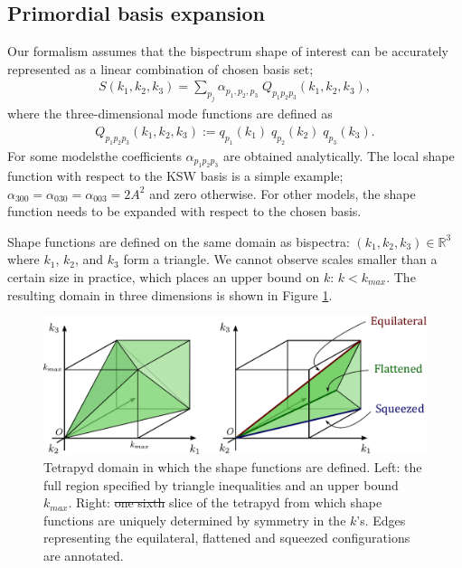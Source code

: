 \documentclass[a4paper,12pt,times,custombib,print,index]{Classes/PhDThesisPSnPDF} %
\providecommand{\DIFadd}[1]{{\protect\color{blue}\uwave{#1}}} %
\providecommand{\DIFdel}[1]{{\protect\color{red}\sout{#1}}}                      %
\providecommand{\DIFaddbegin}{} %
\providecommand{\DIFaddend}{} %
\providecommand{\DIFdelbegin}{} %
\providecommand{\DIFdelend}{} %
\providecommand{\DIFaddFL}[1]{\DIFadd{#1}} %
\providecommand{\DIFdelFL}[1]{\DIFdel{#1}} %
\providecommand{\DIFaddbeginFL}{} %
\providecommand{\DIFaddendFL}{} %
\providecommand{\DIFdelbeginFL}{} %
\providecommand{\DIFdelendFL}{} %
\newcommand{\DIFscaledelfig}{0.5}
\newlength{\DIFdelgraphicswidth} %
\newlength{\DIFdelgraphicsheight} %
\newcommand{\DIFaddincludegraphics}[2][]{{\color{blue}\fbox{\DIFOincludegraphics[#1]{#2}}}} %
\newcommand{\DIFdelincludegraphics}[2][]{%
\sbox{\DIFdelgraphicsbox}{\DIFOincludegraphics[#1]{#2}}%
\settoboxwidth{\DIFdelgraphicswidth}{\DIFdelgraphicsbox} %
\settoboxtotalheight{\DIFdelgraphicsheight}{\DIFdelgraphicsbox} %
\scalebox{\DIFscaledelfig}{%
\parbox[b]{\DIFdelgraphicswidth}{\usebox{\DIFdelgraphicsbox}\\[-\baselineskip] \rule{\DIFdelgraphicswidth}{0em}}\llap{\resizebox{\DIFdelgraphicswidth}{\DIFdelgraphicsheight}{%
\setlength{\unitlength}{\DIFdelgraphicswidth}%
\begin{picture}(1,1)%
\thicklines\linethickness{2pt} %
{\color[rgb]{1,0,0}\put(0,0){\framebox(1,1){}}}%
{\color[rgb]{1,0,0}\put(0,0){\line( 1,1){1}}}%
{\color[rgb]{1,0,0}\put(0,1){\line(1,-1){1}}}%
\end{picture}%
}\hspace*{3pt}}} %
} %
\DeclareRobustCommand{\DIFaddbegin}{\DIFOaddbegin \let\includegraphics\DIFaddincludegraphics} %
\DeclareRobustCommand{\DIFaddend}{\DIFOaddend \let\includegraphics\DIFOincludegraphics} %
\DeclareRobustCommand{\DIFdelbegin}{\DIFOdelbegin \let\includegraphics\DIFdelincludegraphics} %
\DeclareRobustCommand{\DIFdelend}{\DIFOaddend \let\includegraphics\DIFOincludegraphics} %
\DeclareRobustCommand{\DIFaddbeginFL}{\DIFOaddbeginFL \let\includegraphics\DIFaddincludegraphics} %
\DeclareRobustCommand{\DIFaddendFL}{\DIFOaddendFL \let\includegraphics\DIFOincludegraphics} %
\DeclareRobustCommand{\DIFdelbeginFL}{\DIFOdelbeginFL \let\includegraphics\DIFdelincludegraphics} %
\DeclareRobustCommand{\DIFdelendFL}{\DIFOaddendFL \let\includegraphics\DIFOincludegraphics} %
\begin{document}
\subsection{Primordial basis expansion} \label{section:primordial_basis_expansion}

Our formalism assumes that the bispectrum shape of interest can be accurately represented as a linear combination of \DIFaddbegin \DIFadd{a }\DIFaddend chosen basis set; 
\begin{align}
	S(k_1,k_2,k_3) = \sum_{p_j} \alpha_{p_1,p_2,p_3} \; Q_{p_1 p_2 p_3}(k_1, k_2, k_3),
\end{align}
where the three-dimensional mode functions are defined as
\begin{align}
	Q_{p_1 p_2 p_3} (k_1, k_2, k_3) := q_{p_1}(k_1) \; q_{p_2}(k_2) \; q_{p_3}(k_3).
\end{align}
For some models\DIFaddbegin \DIFadd{, }\DIFaddend the coefficients $\alpha_{p_1 p_2 p_3}$ are obtained analytically. The local shape function with respect to the KSW basis is a simple example; $\alpha_{300}=\alpha_{030}=\alpha_{003}=2A^2$ and zero otherwise. For other models, the shape function needs to be expanded with respect to the chosen basis. 

Shape functions are defined on the same domain as bispectra: $(k_1,k_2,k_3) \in \mathbb{R}^3$ where $k_1$, $k_2$, and $k_3$ form a triangle. We cannot observe scales smaller than a certain size in practice, which places an upper bound on $k$: \DIFdelbegin \DIFdel{$k < k_{max}$}\DIFdelend \DIFaddbegin \DIFadd{$k < k_\text{max}$}\DIFaddend . The resulting domain in three dimensions is shown in Figure \ref{fig:tetrapyd}.

\begin{figure}[htbp!] 
	\centering    
	\hspace{10pt}
	\includegraphics[width=1.0\textwidth]{tetrapyd.pdf}
	\caption{Tetrapyd domain in which the shape functions are defined. Left: the full region specified by triangle inequalities and an upper bound \DIFdelbeginFL \DIFdelFL{$k_{max}$}\DIFdelendFL \DIFaddbeginFL \DIFaddFL{$k_\text{max}$}\DIFaddendFL . Right: \DIFdelbeginFL \DIFdelFL{one sixth }\DIFdelendFL \DIFaddbeginFL \DIFaddFL{one-sixth }\DIFaddendFL slice of the tetrapyd from which shape functions are uniquely determined by symmetry in the $k$'s. Edges representing the equilateral, flattened and squeezed configurations are annotated.}
	\label{fig:tetrapyd}
\end{figure}
\end{document}
